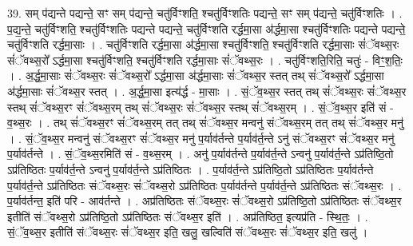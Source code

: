 \documentclass[17pt]{extarticle}
\begin{document}
39. सम् प॑द्यन्ते पद्यन्ते॒ सꣳ सम् प॑द्यन्ते॒ चतु॑र्विꣳशति॒ श्चतु॑र्विꣳशतिः पद्यन्ते॒ सꣳ सम् प॑द्यन्ते॒ चतु॑र्विꣳशतिः । . प॒द्य॒न्ते॒ चतु॑र्विꣳशति॒ श्चतु॑र्विꣳशतिः पद्यन्ते पद्यन्ते॒ चतु॑र्विꣳशति रर्द्धमा॒सा अ॑र्द्धमा॒सा श्चतु॑र्विꣳशतिः पद्यन्ते पद्यन्ते॒ चतु॑र्विꣳशति रर्द्धमा॒साः । . चतु॑र्विꣳशति रर्द्धमा॒सा अ॑र्द्धमा॒सा श्चतु॑र्विꣳशति॒ श्चतु॑र्विꣳशति रर्द्धमा॒साः सं॑ॅवथ्स॒रः सं॑ॅवथ्स॒रो᳚ ऽर्द्धमा॒सा श्चतु॑र्विꣳशति॒ श्चतु॑र्विꣳशति रर्द्धमा॒साः सं॑ॅवथ्स॒रः । . चतु॑र्विꣳशति॒रिति॒ चतुः॑ - विꣳ॒॒श॒तिः॒ । . अ॒र्द्ध॒मा॒साः सं॑ॅवथ्स॒रः सं॑ॅवथ्स॒रो᳚ ऽर्द्धमा॒सा अ॑र्द्धमा॒साः सं॑ॅवथ्स॒र स्तत् तथ् सं॑ॅवथ्स॒रो᳚ ऽर्द्धमा॒सा अ॑र्द्धमा॒साः सं॑ॅवथ्स॒र स्तत् । . अ॒र्द्ध॒मा॒सा इत्य॑र्द्ध - मा॒साः । . सं॒ॅव॒थ्स॒र स्तत् तथ् सं॑ॅवथ्स॒रः सं॑ॅवथ्स॒र स्तथ् सं॑ॅवथ्स॒रꣳ सं॑ॅवथ्स॒रम् तथ् सं॑ॅवथ्स॒रः सं॑ॅवथ्स॒र स्तथ् सं॑ॅवथ्स॒रम् । . सं॒ॅव॒थ्स॒र इति॑ सं - व॒थ्स॒रः । . तथ् सं॑ॅवथ्स॒रꣳ सं॑ॅवथ्स॒रम् तत् तथ् सं॑ॅवथ्स॒र मन्वनु॑ संॅवथ्स॒रम् तत् तथ् सं॑ॅवथ्स॒र मनु॑ । . सं॒ॅव॒थ्स॒र मन्वनु॑ संॅवथ्स॒रꣳ सं॑ॅवथ्स॒र मनु॑ प॒र्याव॑र्तन्ते प॒र्याव॑र्त॒न्ते ऽनु॑ संॅवथ्स॒रꣳ सं॑ॅवथ्स॒र मनु॑ प॒र्याव॑र्तन्ते । . सं॒ॅव॒थ्स॒रमिति॑ सं - व॒थ्स॒रम् । . अनु॑ प॒र्याव॑र्तन्ते प॒र्याव॑र्त॒न्ते ऽन्वनु॑ प॒र्याव॑र्त॒न्ते ऽप्र॑तिष्ठि॒तो ऽप्र॑तिष्ठितः प॒र्याव॑र्त॒न्ते ऽन्वनु॑ प॒र्याव॑र्त॒न्ते ऽप्र॑तिष्ठितः । . प॒र्याव॑र्त॒न्ते ऽप्र॑तिष्ठि॒तो ऽप्र॑तिष्ठितः प॒र्याव॑र्तन्ते प॒र्याव॑र्त॒न्ते ऽप्र॑तिष्ठितः संॅवथ्स॒रः सं॑ॅवथ्स॒रो ऽप्र॑तिष्ठितः प॒र्याव॑र्तन्ते प॒र्याव॑र्त॒न्ते ऽप्र॑तिष्ठितः संॅवथ्स॒रः । . प॒र्याव॑र्तन्त॒ इति॑ परि - आव॑र्तन्ते । . अप्र॑तिष्ठितः संॅवथ्स॒रः सं॑ॅवथ्स॒रो ऽप्र॑तिष्ठि॒तो ऽप्र॑तिष्ठितः संॅवथ्स॒र इतीति॑ संॅवथ्स॒रो ऽप्र॑तिष्ठि॒तो ऽप्र॑तिष्ठितः संॅवथ्स॒र इति॑ । . अप्र॑तिष्ठित॒ इत्यप्र॑ति - स्थि॒तः॒ । . सं॒ॅव॒थ्स॒र इतीति॑ संॅवथ्स॒रः सं॑ॅवथ्स॒र इति॒ खलु॒ खल्विति॑ संॅवथ्स॒रः सं॑ॅवथ्स॒र इति॒ खलु॑ । \newline
\end{document}
